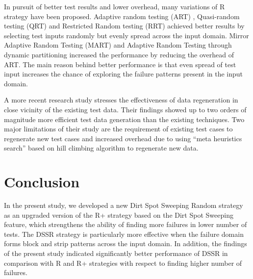 \documentclass[conference]{IEEEtran}
\begin{document}
In pursuit of better test results and lower overhead, many variations of R strategy have been proposed. Adaptive random testing (ART) \cite{Chen2008}, Quasi-random testing (QRT) \cite{Chen2005} and Restricted Random testing (RRT) \cite{Chan2002} achieved better results by selecting test inputs randomly but evenly spread across the input domain. Mirror Adaptive Random Testing (MART) \cite{Chen2003} and Adaptive Random Testing through dynamic partitioning \cite{Chen2003} increased the performance by reducing the overhead of ART. The main reason behind better performance is that even spread of test input increases the chance of exploring the failure patterns present in the input domain.

A more recent research study \cite{Yoo2012} stresses the effectiveness of data regeneration in close vicinity of the existing test data. Their findings showed up to two orders of magnitude more efficient test data generation than the existing techniques. Two major limitations of their study are the requirement of existing test cases to regenerate new test cases and increased overhead due to using ``meta heuristics search'' based on hill climbing algorithm to regenerate new data. 
  





\section{Conclusion}\label{sec:conc}
In the present study, we developed a new Dirt Spot Sweeping Random strategy as an upgraded version of the R+ strategy based on the Dirt Spot Sweeping feature, which strengthens the ability of finding more failures in lower number of tests. The DSSR strategy is particularly more effective when the failure domain forms block and strip patterns across the input domain. In addition, the findings of the present study indicated significantly better performance of DSSR in comparison with R and R+ strategies with respect to finding higher number of failures. 
\end{document}

